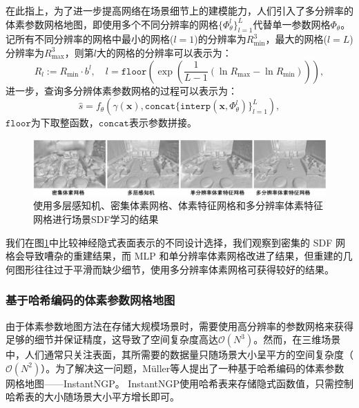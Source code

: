 在此指上，为了进一步提高网络在场景细节上的建模能力，人们引入了多分辨率的体素参数网格地图\cite{yu_monosdf_2022}，即使用多个不同分辨率的网格$\{\Phi^l_\theta\}^L_{l=1}$代替单一参数网格$\Phi_\theta$。记所有不同分辨率的网格中最小的网格($l=1$)的分辨率为$R_{\min}^3$，最大的网格($l=L$)分辨率为$R_{\max}^3$，则第$l$大的网格的分辨率可以表示为：
\begin{equation}
    R_l:=R_{\min}\cdot b^l, \quad l=\mathtt{floor}(\exp(\frac{1}{L - 1}(\ln R_{\max} - \ln R_{\min}))),
\end{equation}
进一步，查询多分辨体素参数网格的过程可以表示为：
\begin{equation}
    \hat{s} = f_\theta(\gamma(\mathbf{x}), \mathtt{concat}\{\mathtt{interp}(\mathbf{x}, \Phi_\theta^l)\}_{l=1}^L),
\end{equation}
$\mathtt{floor}$为下取整函数，$\mathtt{concat}$表示参数拼接。

\begin{figure}[ht]
    \centering
    \includegraphics[width=\textwidth]{undergraduate-thesis/images/related-work/monosdf-result.pdf}
    \caption{使用多层感知机、密集体素网格、体素特征网格和多分辨率体素特征网格进行场景SDF学习的结果}
    \label{fig:related-work monosdf result}
\end{figure}

我们在图\ref{fig:related-work monosdf result}中比较神经隐式表面表示的不同设计选择，我们观察到密集的 SDF 网格会导致嘈杂的重建结果，而 MLP 和单分辨率体素网格改进了结果，但重建的几何图形往往过于平滑而缺少细节，使用多分辨率体素网格可获得较好的结果。

\subsubsection{基于哈希编码的体素参数网格地图}
由于体素参数地图方法在存储大规模场景时，需要使用高分辨率的参数网格来获得足够的细节并保证精度，这导致了空间复杂度高达$\mathcal{O}(N^3)$。然而，在三维场景中，人们通常只关注表面，其所需要的数据量只随场景大小呈平方的空间复杂度（$\mathcal{O}(N^2)$）。为了解决这一问题，M\"uller等人提出了一种基于哈希编码的体素参数网格地图——InstantNGP\cite{muller_instant_2022}。 InstantNGP使用哈希表来存储隐式函数值，只需控制哈希表的大小随场景大小平方增长即可。

